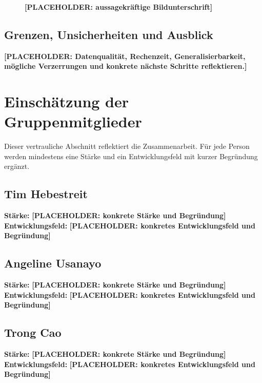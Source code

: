 \documentclass[11pt,a4paper]{article}
\newcommand{\placeholder}[1]{\textcolor{ADAgold}{\textbf{[PLACEHOLDER: #1]}}}
\begin{document}
\begin{figure}[htbp]
  \centering
  \caption{\placeholder{aussagekräftige Bildunterschrift}}
  \label{fig:placeholder}
\end{figure}

\subsection{Grenzen, Unsicherheiten und Ausblick}
\placeholder{Datenqualität, Rechenzeit, Generalisierbarkeit, mögliche Verzerrungen und
konkrete nächste Schritte reflektieren.}

\section{Einschätzung der Gruppenmitglieder}
Dieser vertrauliche Abschnitt reflektiert die Zusammenarbeit. Für jede Person werden
mindestens eine Stärke und ein Entwicklungsfeld mit kurzer Begründung ergänzt.

\subsection*{Tim Hebestreit}
\textbf{Stärke:} \placeholder{konkrete Stärke und Begründung}\\
\textbf{Entwicklungsfeld:} \placeholder{konkretes Entwicklungsfeld und Begründung}

\subsection*{Angeline Usanayo}
\textbf{Stärke:} \placeholder{konkrete Stärke und Begründung}\\
\textbf{Entwicklungsfeld:} \placeholder{konkretes Entwicklungsfeld und Begründung}

\subsection*{Trong Cao}
\textbf{Stärke:} \placeholder{konkrete Stärke und Begründung}\\
\textbf{Entwicklungsfeld:} \placeholder{konkretes Entwicklungsfeld und Begründung}
\end{document}
